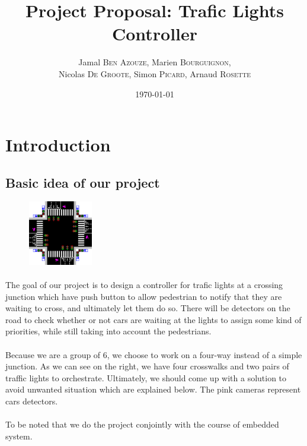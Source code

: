 \documentclass{article}
\title{Project Proposal: Trafic Lights Controller}
\author{Jamal \textsc{Ben Azouze}, Marien \textsc{Bourguignon},\\ Nicolas \textsc{De Groote}, Simon \textsc{Picard}, Arnaud \textsc{Rosette}} %
\date{\today} %
\begin{document}
\maketitle %


\section{Introduction}
\subsection{Basic idea of our project}
\begin{figure}
  \begin{center}
    \includegraphics[width=0.25\textwidth]{schema.png}
  \end{center}
\end{figure}
\paragraph{}
The goal of our project is to design a controller for trafic lights at a crossing junction which have push button to allow pedestrian to notify that they are waiting to cross, and ultimately let them do so.
There will be detectors on the road to check whether or not cars are waiting at the lights to assign some kind of priorities, while still taking into account the pedestrians.

\paragraph{}
Because we are a group of 6, we choose to work on a four-way instead of a simple junction. As we can see on the right, we have four crosswalks and two pairs of traffic lights to orchestrate. Ultimately, we should come up with a solution to avoid unwanted situation which are explained below. The pink cameras represent cars detectors.

\paragraph{}
To be noted that we do the project conjointly with the course of embedded system.\\ 
\end{document}
